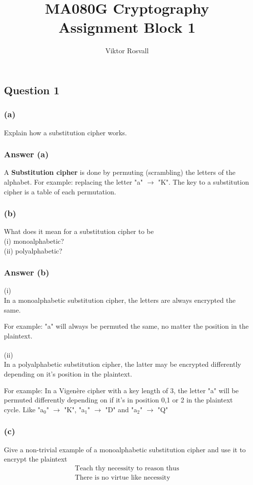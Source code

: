 \documentclass{article}
\title{MA080G Cryptography Assignment Block 1}
\author{Viktor Rosvall}
\begin{document}
	\maketitle
	
	\subsection*{Question 1}
	\subsubsection*{(a)}
	Explain how a substitution cipher works.
	
	\subsubsection*{Answer (a)}
	A \textbf{Substitution cipher} is done by permuting (scrambling) the letters of the alphabet. For example: replacing the letter "a" $\rightarrow$ "K". The key to a substitution cipher is a table of each permutation.
	
	\subsubsection*{(b)}
	What does it mean for a substitution cipher to be
	\\
	(i) monoalphabetic?\\
	(ii) polyalphabetic?
	
	\subsubsection*{Answer (b)}
	(i)\\
	In a monoalphabetic substitution cipher, the letters are always encrypted the same. 
	
	For example: "a" will always be permuted the same, no matter the position in the plaintext. 
	\\\\
	(ii)\\
	In a polyalphabetic substitution cipher, the latter may be encrypted differently depending on it’s position in the plaintext. 
	
	For example: In a Vigenère cipher with a key length of 3, the letter "a" will be permuted differently depending on if it's in position 0,1 or 2 in the plaintext cycle. Like "a$_0$" $\rightarrow$ "K", "a$_1$" $\rightarrow$ "D" and "a$_2$" $\rightarrow$ "Q" 
		
	\subsubsection*{(c)}
	Give a non-trivial example of a monoalphabetic substitution cipher and use it to
	encrypt the plaintext
	\[
	\begin{split}
	\text{Teach thy necessity to reason thus} \\
		\text{There is no virtue like necessity}
	\end{split}
	\]
	
\end{document}
